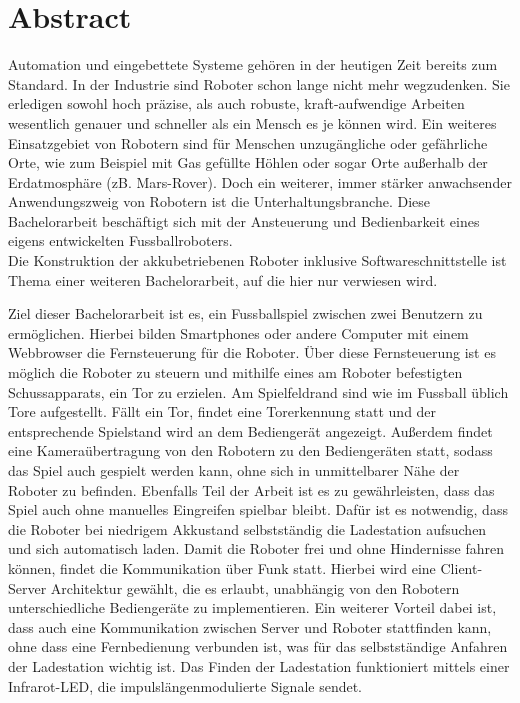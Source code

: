 \chapter*{Abstract}
Automation und eingebettete Systeme gehören in der heutigen Zeit bereits zum Standard. In der Industrie sind Roboter schon lange nicht mehr wegzudenken. Sie erledigen sowohl hoch präzise, als auch robuste, kraft-aufwendige Arbeiten wesentlich genauer und schneller als ein Mensch es je können wird. Ein weiteres Einsatzgebiet von Robotern sind für Menschen unzugängliche oder gefährliche Orte, wie zum Beispiel mit Gas gefüllte Höhlen oder sogar Orte außerhalb der Erdatmosphäre (zB. Mars-Rover). Doch ein weiterer, immer stärker anwachsender Anwendungszweig von Robotern ist die Unterhaltungsbranche. Diese Bachelorarbeit beschäftigt sich mit der Ansteuerung und Bedienbarkeit eines eigens entwickelten Fussballroboters. \\
Die Konstruktion der akkubetriebenen Roboter inklusive Softwareschnittstelle ist Thema einer weiteren Bachelorarbeit, auf die hier nur verwiesen wird.

Ziel dieser Bachelorarbeit ist es, ein Fussballspiel zwischen zwei Benutzern zu ermöglichen. Hierbei bilden Smartphones oder andere Computer mit einem Webbrowser die Fernsteuerung für die Roboter. Über diese Fernsteuerung ist es möglich die Roboter zu steuern und mithilfe eines am Roboter befestigten Schussapparats, ein Tor zu erzielen. Am Spielfeldrand sind wie im Fussball üblich Tore aufgestellt. Fällt ein Tor, findet eine Torerkennung statt und der entsprechende Spielstand wird an dem Bediengerät angezeigt. Außerdem findet eine Kameraübertragung von den Robotern zu den Bediengeräten statt, sodass das Spiel auch gespielt werden kann, ohne sich in unmittelbarer Nähe der Roboter zu befinden. Ebenfalls Teil der Arbeit ist es zu gewährleisten, dass das Spiel auch ohne manuelles Eingreifen spielbar bleibt. Dafür ist es notwendig, dass die Roboter bei niedrigem Akkustand selbstständig die Ladestation aufsuchen und sich automatisch laden. 
Damit die Roboter frei und ohne Hindernisse fahren können, findet die Kommunikation über Funk statt. Hierbei wird eine Client-Server Architektur gewählt, die es erlaubt, unabhängig von den Robotern unterschiedliche Bediengeräte zu implementieren. Ein weiterer Vorteil dabei ist, dass auch eine Kommunikation zwischen Server und Roboter stattfinden kann, ohne dass eine Fernbedienung verbunden ist, was für das selbstständige Anfahren der Ladestation wichtig ist. Das Finden der Ladestation funktioniert mittels einer Infrarot-LED, die impulslängenmodulierte Signale sendet.


